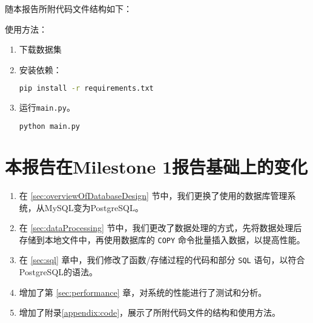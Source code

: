 \documentclass[UTF8,openany]{ctexbook}
\begin{document}
随本报告所附代码文件结构如下：


使用方法：



\begin{enumerate}
  \item 下载数据集
  \item 安装依赖：
\begin{lstlisting}[language=bash]
pip install -r requirements.txt
\end{lstlisting}
  \item 运行\texttt{main.py}。
\begin{lstlisting}[language=bash]
python main.py
\end{lstlisting}
\end{enumerate}

\newpage

\chapter{本报告在Milestone 1报告基础上的变化}

\begin{enumerate}
    \item 在 \ref{sec:overviewOfDatabaseDesign} 节中，我们更换了使用的数据库管理系统，从MySQL变为PostgreSQL。
    \item 在 \ref{sec:dataProcessing} 节中，我们更改了数据处理的方式，先将数据处理后存储到本地文件中，再使用数据库的 \texttt{COPY} 命令批量插入数据，以提高性能。
    \item 在 \ref{sec:sql} 章中，我们修改了函数/存储过程的代码和部分 \texttt{SQL} 语句，以符合PostgreSQL的语法。
    \item 增加了第 \ref{sec:performance} 章，对系统的性能进行了测试和分析。
    \item 增加了附录\ref{appendix:code}，展示了所附代码文件的结构和使用方法。
\end{enumerate}
\end{document}
